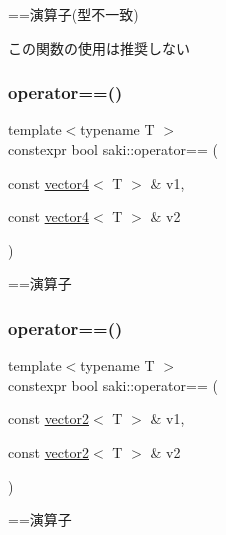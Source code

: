 ==演算子(型不一致) 

この関数の使用は推奨しない \mbox{\label{namespacesaki_abe77ceb7257097320a66f9f182d11111}} 
\subsubsection{\texorpdfstring{operator==()}{operator==()}\hspace{0.1cm}{\footnotesize\ttfamily [5/14]}}
{\footnotesize\ttfamily template$<$typename T $>$ \\
constexpr bool saki\+::operator== (\begin{DoxyParamCaption}\item[{const \mbox{\hyperlink{classsaki_1_1vector4}{vector4}}$<$ T $>$ \&}]{v1,  }\item[{const \mbox{\hyperlink{classsaki_1_1vector4}{vector4}}$<$ T $>$ \&}]{v2 }\end{DoxyParamCaption})}



==演算子 

\mbox{\label{namespacesaki_a2aafc5056183a1a522b89497ee3439e9}} 
\subsubsection{\texorpdfstring{operator==()}{operator==()}\hspace{0.1cm}{\footnotesize\ttfamily [6/14]}}
{\footnotesize\ttfamily template$<$typename T $>$ \\
constexpr bool saki\+::operator== (\begin{DoxyParamCaption}\item[{const \mbox{\hyperlink{classsaki_1_1vector2}{vector2}}$<$ T $>$ \&}]{v1,  }\item[{const \mbox{\hyperlink{classsaki_1_1vector2}{vector2}}$<$ T $>$ \&}]{v2 }\end{DoxyParamCaption})}



==演算子 

\mbox{\label{namespacesaki_a5f3eb3ebd6a3ee43771849069101153f}} 
